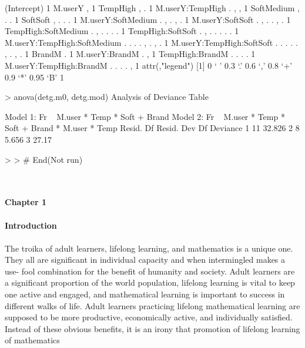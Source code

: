 \documentclass{article}
\begin{document}
\begin{Schunk}
\begin{Soutput}
(Intercept)                 1                              
M.userY                     , 1                            
TempHigh                    , . 1                          
M.userY:TempHigh            . , , 1                        
SoftMedium                  , . .   1                      
SoftSoft                    , . .   . 1                    
M.userY:SoftMedium          . ,   . , . 1                  
M.userY:SoftSoft            . ,   . . , . 1                
TempHigh:SoftMedium         .   , . . . .   1              
TempHigh:SoftSoft           .   , . . .   . . 1            
M.userY:TempHigh:SoftMedium   . . . .   , . , . 1          
M.userY:TempHigh:SoftSoft     . . .   . . , . , . 1        
BrandM                      .                       1      
M.userY:BrandM                .                     , 1    
TempHigh:BrandM                 . .                 . . 1  
M.userY:TempHigh:BrandM         . .                 . . , 1
attr(,"legend")
[1] 0 ‘ ’ 0.3 ‘.’ 0.6 ‘,’ 0.8 ‘+’ 0.9 ‘*’ 0.95 ‘B’ 1


> anova(detg.m0, detg.mod)
Analysis of Deviance Table

Model 1: Fr ~ M.user * Temp * Soft + Brand
Model 2: Fr ~ M.user * Temp * Soft + Brand * M.user * Temp
  Resid. Df Resid. Dev Df Deviance
1        11     32.826            
2         8      5.656  3    27.17
\end{Soutput}
\begin{Sinput}
> 
> # End(Not run)
\end{Sinput}
\end{Schunk}
\textit{\textit{\\\\}}
\textbf{ Chapter 1 }
\textit{\\\\}
\textbf{ Introduction }
\textit{\\\\}
The troika of adult learners, lifelong learning, and mathematics is a unique one.
They all are significant in individual capacity and when intermingled makes a use-
fool combination for the benefit of humanity and society. Adult learners are a significant
proportion of the world population, lifelong learning is vital to keep one active
and engaged, and mathematical learning is important to success in different walks
of life. Adult learners practicing lifelong mathematical learning are supposed to be
more productive, economically active, and individually satisfied. Instead of these
obvious benefits, it is an irony that promotion of lifelong learning of mathematics
\end{document}
